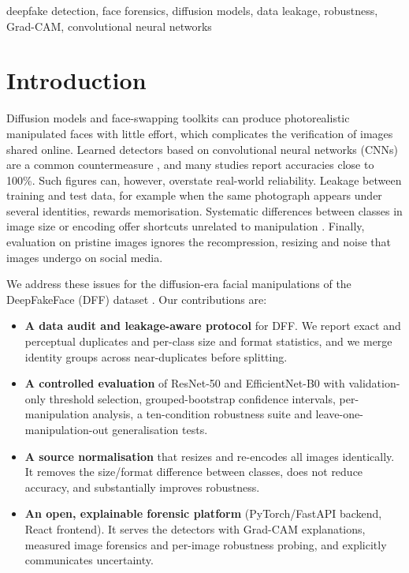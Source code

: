 \documentclass[conference]{IEEEtran}
\begin{document}
\begin{IEEEkeywords}
deepfake detection, face forensics, diffusion models, data leakage, robustness, Grad-CAM, convolutional neural networks
\end{IEEEkeywords}

\section{Introduction}
Diffusion models and face-swapping toolkits can produce photorealistic manipulated faces with little effort, which complicates the verification of images shared online. Learned detectors based on convolutional neural networks (CNNs) are a common countermeasure \cite{rossler2019ff,wang2020cnn}, and many studies report accuracies close to 100\%. Such figures can, however, overstate real-world reliability. Leakage between training and test data, for example when the same photograph appears under several identities, rewards memorisation. Systematic differences between classes in image size or encoding offer shortcuts unrelated to manipulation \cite{grommelt2024fake}. Finally, evaluation on pristine images ignores the recompression, resizing and noise that images undergo on social media.

We address these issues for the diffusion-era facial manipulations of the DeepFakeFace (DFF) dataset \cite{song2023dff}. Our contributions are:
\begin{itemize}
\item \textbf{A data audit and leakage-aware protocol} for DFF. We report exact and perceptual duplicates and per-class size and format statistics, and we merge identity groups across near-duplicates before splitting.
\item \textbf{A controlled evaluation} of ResNet-50 \cite{he2016resnet} and EfficientNet-B0 \cite{tan2019efficientnet} with validation-only threshold selection, grouped-bootstrap confidence intervals, per-manipulation analysis, a ten-condition robustness suite and leave-one-manipulation-out generalisation tests.
\item \textbf{A source normalisation} that resizes and re-encodes all images identically. It removes the size/format difference between classes, does not reduce accuracy, and substantially improves robustness.
\item \textbf{An open, explainable forensic platform} (PyTorch/FastAPI backend, React frontend). It serves the detectors with Grad-CAM \cite{selvaraju2017gradcam} explanations, measured image forensics and per-image robustness probing, and explicitly communicates uncertainty.
\end{itemize}
\end{document}
